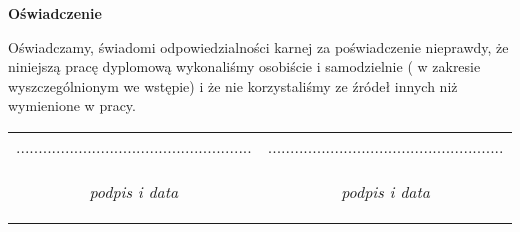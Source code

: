\clearpage
\thispagestyle{empty}

\begin{center}
  \textbf{Oświadczenie}
\end{center}

\vskip 20pt

Oświadczamy, świadomi odpowiedzialności karnej za poświadczenie nieprawdy, że niniejszą pracę dyplomową wykonaliśmy osobiście i samodzielnie ( w zakresie wyszczególnionym we wstępie) i że nie korzystaliśmy ze źródeł innych niż wymienione w pracy.

\vskip 60pt

\begin{center}
\begin{tabular}{c c}

..................................................... & ..................................................... \\
\begin{footnotesize}
\textit{podpis i data}
\end{footnotesize}
&
\begin{footnotesize}
\textit{podpis i data}
\end{footnotesize}
\\

\end{tabular}
\end{center}
